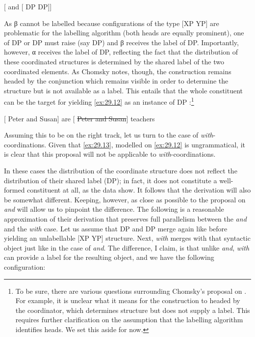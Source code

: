 \documentclass[output=paper]{langsci/langscibook}
\begin{document}
\ea\label{ex:29.11}
    {}[ and [ DP DP]]
\z

As β cannot be labelled because configurations of the type [XP YP] are
problematic for the labelling algorithm (both heads are equally prominent), one
of DP or DP must raise (say DP) and β receives the label
of DP. Importantly, however, α receives the label of DP,
reflecting the fact that the distribution of these coordinated structures is
determined by the shared label of the two coordinated elements. As Chomsky
notes, though, the construction remains headed by the conjunction which remains
visible in order to determine the structure but is not available as a label.
This entails that the whole constituent can be the target for  yielding
\eqref{ex:29.12} as an instance of DP :\footnote{To be sure, there are various
questions surrounding Chomsky's proposal on . For example, it is
unclear what it means for the construction to headed by the coordinator, which
determines structure but does not supply a label. This requires further
clarification on the assumption that the labelling algorithm identifies heads.
We set this aside for now.}

\ea\label{ex:29.12}
    {}[ Peter and Susan] are [\sout{ Peter and Susan}] teachers
\z

Assuming this to be on the right track, let us turn to the case of
\emph{with}-coor\-di\-na\-tions. Given that \eqref{ex:29.13}, modelled on
\eqref{ex:29.12} is ungrammatical, it is clear that this proposal will not
be applicable to \emph{with}-coor\-di\-na\-tions.

\label{ex:29.13}
\z

In these cases the distribution of the coordinate structure does not reflect
the distribution of their shared label (DP); in fact, it does not constitute a
well-formed constituent at all, as the data show. It follows that the derivation
will also be somewhat different. Keeping, however, as close as possible to the
proposal on \emph{and} will allow us to pinpoint the difference. The following
is a reasonable approximation of their derivation that preserves full
parallelism between the \emph{and} and the \emph{with} case. Let us assume that
DP and DP merge again like before yielding an unlabellable [XP YP]
structure. Next, \emph{with} merges with that syntactic object just like in the
case of \emph{and}. The difference, I claim, is that unlike \emph{and},
\emph{with} can provide a label for the resulting object, and we have the
following configuration:
\end{document}
